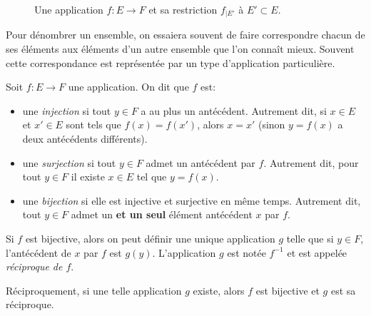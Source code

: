 \documentclass[twoside,11pt]{article}
\theoremstyle{definition}
\theoremstyle{remark}
\theoremstyle{theorem}
\begin{document}
\begin{figure}
\centering
{}
\caption{Une application $f\colon E\longrightarrow F$ et sa restriction $f_{|E'}$ à $E'\subset E$.}
\end{figure}

Pour dénombrer un ensemble, on essaiera souvent de faire correspondre chacun de ses éléments aux éléments d'un autre ensemble que l'on connaît mieux. Souvent cette correspondance est représentée par un type d'application particulière.
\begin{defn}
	Soit $f:E\longrightarrow F$ une application. On dit que $f$ est:
	\begin{itemize}
	\item une \textit{injection} si tout $y\in F$ a au plus un antécédent. Autrement dit, si $x\in E$ et $x'\in E$ sont tels que $f(x)=f(x')$, alors $x=x'$ (sinon $y=f(x)$ a deux antécédents différents).
	\item une \textit{surjection} si tout $y\in F$ admet un antécédent par $f$. Autrement dit, pour tout $y\in F$ il existe $x\in E$ tel que $y=f(x)$.
	\item une \textit{bijection} si elle est injective et surjective en même temps. Autrement dit, tout $y\in F$ admet un \textbf{et un seul} élément antécédent $x$ par $f$.
	\end{itemize}
	
	Si $f$ est bijective, alors on peut définir une unique application $g$ telle que si $y\in F$, l'antécédent de $x$ par $f$ est $g(y)$. L'application $g$ est notée $f^{-1}$ et est appelée \textit{réciproque de $f$}.
	
	Réciproquement, si une telle application $g$ existe, alors $f$ est bijective et $g$ est sa réciproque.
\end{defn}
\end{document}
